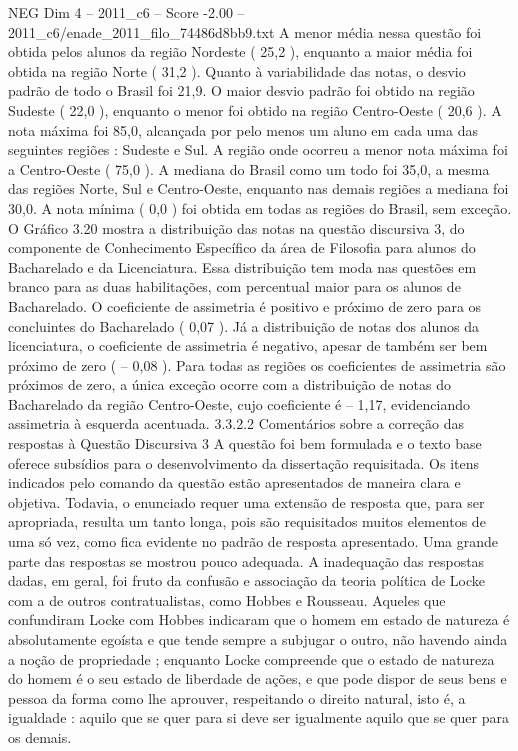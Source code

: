 \begin{textsample}{NEG Dim 4 – 2011\_c6 – Score -2.00 – 2011\_c6/enade\_2011\_filo\_74486d8bb9.txt}
A menor média nessa questão foi obtida pelos alunos da região Nordeste ( 25,2 ), enquanto a maior média foi obtida na região Norte ( 31,2 ).
Quanto à variabilidade das notas, o desvio padrão de todo o Brasil foi 21,9.
O maior desvio padrão foi obtido na região Sudeste ( 22,0 ), enquanto o menor foi obtido na região Centro-Oeste ( 20,6 ).
A nota máxima foi 85,0, alcançada por pelo menos um aluno em cada uma das seguintes regiões : Sudeste e Sul.
A região onde ocorreu a menor nota máxima foi a Centro-Oeste ( 75,0 ).
A mediana do Brasil como um todo foi 35,0, a mesma das regiões Norte, Sul e Centro-Oeste, enquanto nas demais regiões a mediana foi 30,0.
A nota mínima ( 0,0 ) foi obtida em todas as regiões do Brasil, sem exceção.
O Gráfico 3.20 mostra a distribuição das notas na questão discursiva 3, do componente de Conhecimento Específico da área de Filosofia para alunos do Bacharelado e da Licenciatura.
Essa distribuição tem moda nas questões em branco para as duas habilitações, com percentual maior para os alunos de Bacharelado.
O coeficiente de assimetria é positivo e próximo de zero para os concluintes do Bacharelado ( 0,07 ).
Já a distribuição de notas dos alunos da licenciatura, o coeficiente de assimetria é negativo, apesar de também ser bem próximo de zero ( – 0,08 ).
Para todas as regiões os coeficientes de assimetria são próximos de zero, a única exceção ocorre com a distribuição de notas do Bacharelado da região Centro-Oeste, cujo coeficiente é – 1,17, evidenciando assimetria à esquerda acentuada. 3.3.2.2 Comentários sobre a correção das respostas à Questão Discursiva 3 A questão foi bem formulada e o texto base oferece subsídios para o desenvolvimento da dissertação requisitada.
Os itens indicados pelo comando da questão estão apresentados de maneira clara e objetiva.
Todavia, o enunciado requer uma extensão de resposta que, para ser apropriada, resulta um tanto longa, pois são requisitados muitos elementos de uma só vez, como fica evidente no padrão de resposta apresentado.
Uma grande parte das respostas se mostrou pouco adequada.
A inadequação das respostas dadas, em geral, foi fruto da confusão e associação da teoria política de Locke com a de outros contratualistas, como Hobbes e Rousseau.
Aqueles que confundiram Locke com Hobbes indicaram que o homem em estado de natureza é absolutamente egoísta e que tende sempre a subjugar o outro, não havendo ainda a noção de propriedade ; enquanto Locke compreende que o estado de natureza do homem é o seu estado de liberdade de ações, e que pode dispor de seus bens e pessoa da forma como lhe aprouver, respeitando o direito natural, isto é, a igualdade : aquilo que se quer para si deve ser igualmente aquilo que se quer para os demais.

\end{textsample}
